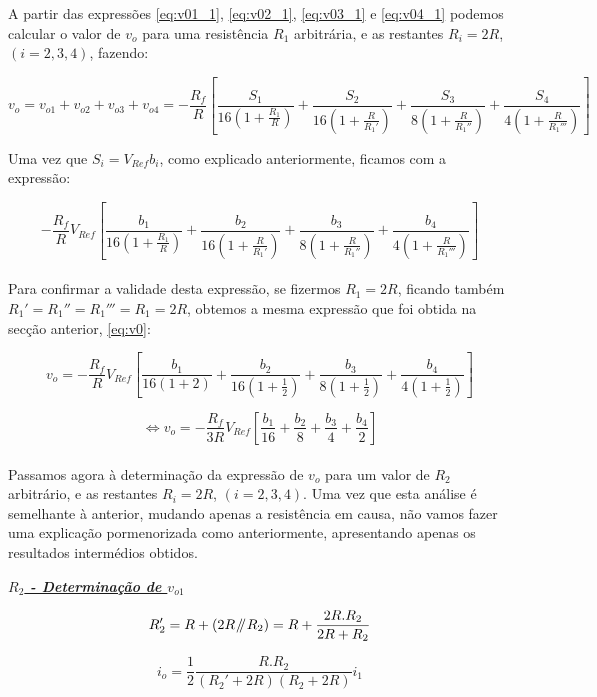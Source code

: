 \documentclass[a4paper,11pt]{report}
\newcommand{\parallelsum}{\mathbin{\!/\mkern-5mu/\!}} %
\begin{document}
A partir das expressões \ref{eq:v01_1},  \ref{eq:v02_1},  \ref{eq:v03_1} e \ref{eq:v04_1} podemos calcular o valor de $v_o$ para uma resistência $R_1$ arbitrária, e as restantes $R_i=2R$, $\left(i=2,3,4\right)$, fazendo:

$$v_o=v_{o1}+v_{o2}+v_{o3}+v_{o4}=-\frac{R_f}{R}\left[\frac{S_1}{16\left(1+\frac{R_1}{R}\right)}+\frac{S_2}{16\left(1+\frac{R}{R_1'}\right)}+\frac{S_3}{8\left(1+\frac{R}{R_1''}\right)}+\frac{S_4}{4\left(1+\frac{R}{R_1'''}\right)}\right]$$

Uma vez que $S_i=V_{Ref}b_i$, como explicado anteriormente, ficamos com a expressão:

\begin{equation}\label{eq:v0_1}
-\frac{R_f}{R}V_{Ref}\left[\frac{b_1}{16\left(1+\frac{R_1}{R}\right)}+\frac{b_2}{16\left(1+\frac{R}{R_1'}\right)}+\frac{b_3}{8\left(1+\frac{R}{R_1''}\right)}+\frac{b_4}{4\left(1+\frac{R}{R_1'''}\right)}\right]
\end{equation}\\

Para confirmar a validade desta expressão, se fizermos $R_1=2R$, ficando também $R_1'=R_1''=R_1'''=R_1=2R$, obtemos a mesma expressão que foi obtida na secção anterior, \ref{eq:v0}:

$$v_o=-\frac{R_f}{R}V_{Ref}\left[\frac{b_1}{16\left(1+2\right)}+\frac{b_2}{16\left(1+\frac{1}{2}\right)}+\frac{b_3}{8\left(1+\frac{1}{2}\right)}+\frac{b_4}{4\left(1+\frac{1}{2}\right)}\right]$$

$$\Leftrightarrow v_o=-\frac{R_f}{3R}V_{Ref}\left[\frac{b_1}{16}+\frac{b_2}{8}+\frac{b_3}{4}+\frac{b_4}{2}\right]$$\\

Passamos agora à determinação da expressão de $v_o$ para um valor de $R_2$ arbitrário, e as restantes $R_i=2R$, $\left(i=2,3,4\right)$. Uma vez que esta análise é semelhante à anterior, mudando apenas a resistência em causa, não vamos fazer uma explicação pormenorizada como anteriormente, apresentando apenas os resultados intermédios obtidos.\\

\par

\large\underline{\textit{\textbf{$R_2$ - Determinação de $v_{o1}$}}}\\
\par

$$R_2'=R+\left(2R\parallelsum R_2\right)=R+\frac{2R.R_2}{2R+R_2}$$

$$i_o=\frac{1}{2}\frac{R.R_2}{\left(R_2'+2R\right)\left(R_2+2R\right)}i_1$$
\end{document}
